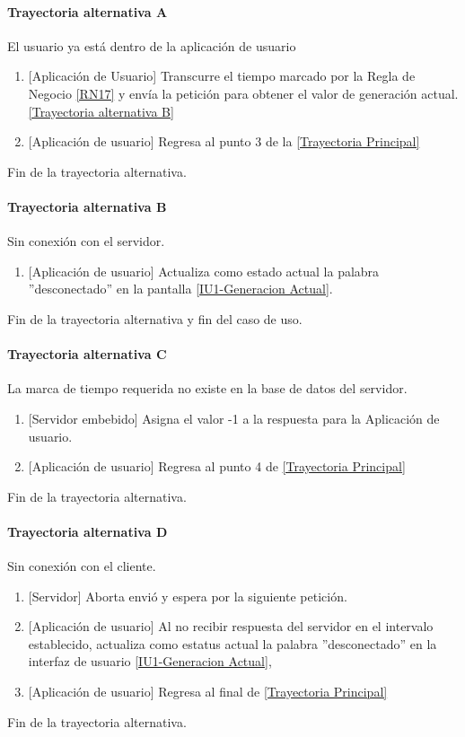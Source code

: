 \paragraph{Trayectoria alternativa A} \label{SUB-U-CU1.1:TA}
	El usuario ya está dentro de la aplicación de usuario
	\begin{enumerate}[label=A\arabic*.]
		\item {[Aplicación de Usuario]} Transcurre el tiempo marcado por la Regla de Negocio \ref{RN17} y envía la petición para obtener el valor de generación actual. \hyperref[SUB-U-CU1.1:TB]{[Trayectoria alternativa B]} 
		\item {[Aplicación de usuario]} Regresa al punto 3 de la \hyperref[SUB-U-CU1.1:TP]{[Trayectoria Principal]}
	\end{enumerate}
	Fin de la trayectoria alternativa.

\paragraph{Trayectoria alternativa B} \label{SUB-U-CU1.1:TB}
	Sin conexión con el servidor.
	\begin{enumerate}[label=B\arabic*.]
		\item {[Aplicación de usuario]} Actualiza como estado actual la palabra ''desconectado'' en la pantalla \hyperref[fig:monitoreo]{[IU1-Generacion Actual]}.
	\end{enumerate}
	Fin de la trayectoria alternativa y fin del caso de uso.

\paragraph{Trayectoria alternativa C} \label{SUB-U-CU1.1:TC}
	La marca de tiempo requerida no existe en la base de datos del servidor.
	\begin{enumerate}[label=C\arabic*.]
		\item {[Servidor embebido]} Asigna el valor -1 a la respuesta para la Aplicación de usuario.
		\item {[Aplicación de usuario]} Regresa al punto 4 de \hyperref[SUB-U-CU1.13:TP]{[Trayectoria Principal]}
	\end{enumerate}
	Fin de la trayectoria alternativa.

\paragraph{Trayectoria alternativa D} \label{SUB-U-CU1.13:TD}
	Sin conexión con el cliente.
	\begin{enumerate}[label=D\arabic*.]
		\item {[Servidor]} Aborta envió y espera por la siguiente petición.
		\item {[Aplicación de usuario]} Al no recibir respuesta del servidor en el intervalo establecido, actualiza como estatus actual la palabra ''desconectado'' en la interfaz de usuario \hyperref[fig:monitoreo]{[IU1-Generacion Actual]},
		\item {[Aplicación de usuario]} Regresa al final de \hyperref[SUB-U-CU1.13:TP]{[Trayectoria Principal]}
	\end{enumerate}
	Fin de la trayectoria alternativa.
	
